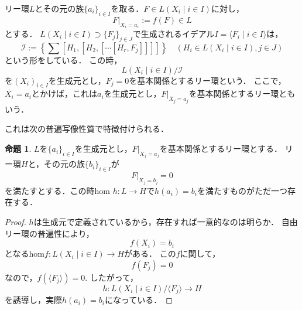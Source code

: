 \documentclass[dvipdfmx,autodetect-engine]{article}
\theoremstyle{definition}
\newtheorem{Prop}{命題}
\begin{document}
        リー環$L$とその元の族$\{a_i\}_{i \in I}$を取る．$F \in L(X_i \mid i \in I)$に対し，
        \[
            F|_{X_i = a_i} := f(F) \in L
        \]
        とする．
        $L(X_i \mid i \in I) \supset \{ F_j \}_{j \in J}$で生成されるイデアル$I = \langle F_i \mid i \in I \rangle$は，
        \[
            \mathcal{I} := \left\{ \sum[H_1, [H_2, [\cdots [H_r, F_j]]]] \right\} \quad(H_i \in L(X_i \mid i \in I), j \in J)
        \]
        という形をしている．
        この時，
        \[
            L(X_i \mid i \in I)/\mathcal{I}
        \]
        を$(X_i)_{i \in I}$を生成元とし，$F_j = 0$を基本関係とするリー環という．
        ここで，$\overline{X_i} = a_i$とかけば，これは$a_i$を生成元とし，$F|_{X_j = a_j}$を基本関係とするリー環ともいう．

        これは次の普遍写像性質で特徴付けられる．
        \begin{Prop}
            $L$を$\{a_i\}_{i \in I}$を生成元とし，$F|_{X_j = a_j}$を基本関係とするリー環とする．
            リー環$H$と，その元の族$\{b_i\}_{i \in I}$が
            \[
                F|_{X_j = b_j} = 0
            \]
            を満たすとする．この時hom $h:L \to H$で$h(a_i) = b_i$を満たすものがただ一つ存在する．
        \end{Prop}
        \begin{proof}
             $h$は生成元で定義されているから，存在すれば一意的なのは明らか．
             自由リー環の普遍性により，
             \[
                f(X_i) = b_i
             \]
             となるhom$f: L(X_i \mid i \in I) \to H$がある．
             この$f$に関して，
             \[
                f(F_j) = 0
             \]
             なので，$f(\langle F_j \rangle) = 0$.
             したがって，
             \[
                h: L(X_i \mid i \in I)/\langle F_j \rangle \to H
             \]
             を誘導し，実際$h(a_i) = b_i$になっている．
        \end{proof}
        
\end{document}
